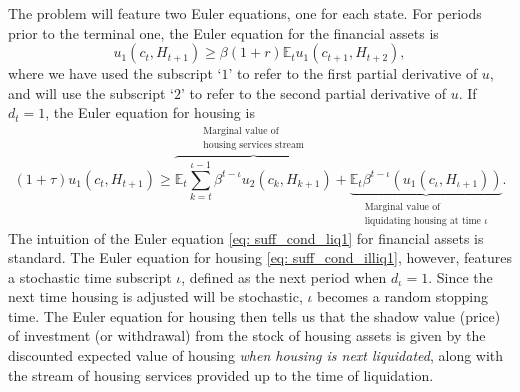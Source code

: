 \documentclass[12pt]{article}
\begin{document}
The problem will feature two Euler equations, one for each state. For periods prior to the terminal one, the Euler equation for the financial assets is
%
\begin{equation}\label{eq: suff_cond_liq1}
    u_{1}(c_{t},  H_{t+1})\geq \beta (1+r)\mathbb{E}_{t}u_{1}(c_{t+1}, H_{t+2}),
\end{equation}
%
where we have used the subscript `$1$' to refer to the first partial derivative of $u$, and will use the subscript `$2$' to refer to the second partial derivative of $u$. If $d_{t}=1$, the Euler equation for housing is
%
\begin{equation}\label{eq: suff_cond_illiq1}
    (1+\tau)u_{1}(c_{t},  H_{t+1})\geq \overbrace{\mathbb{E}_{t}\sum_{k = t}^{\iota-1}\beta^{t-\iota}u_{2}(c_{k},  H_{k+1})}^{\substack{\text{Marginal value of} \\ \text{housing services stream}}} + \underbrace{\mathbb{E}_{t}\beta^{t-\iota}\left(u_{1}(c_{\iota},  H_{\iota+1})\right)}_{\substack{\text{Marginal value of} \\ \text{liquidating housing at time $\iota$}}}.
\end{equation}
%
The intuition of the Euler equation \eqref{eq: suff_cond_liq1} for financial assets is standard. The Euler equation for housing \eqref{eq: suff_cond_illiq1}, however, features a stochastic time subscript $\iota$, defined as the next period when $d_{\iota} = 1$. Since the next time housing is adjusted will be stochastic, $\iota$ becomes a random stopping time. The Euler equation for housing then tells us that the shadow value (price) of investment (or withdrawal) from the stock of housing assets is given by the discounted expected value of housing \emph{when housing is next liquidated}, along with the stream of housing services provided up to the time of liquidation. 
 
\end{document}
